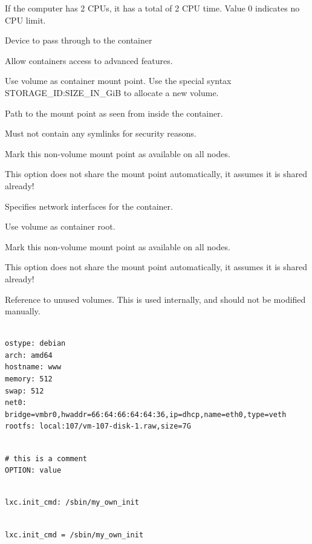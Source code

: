 If the computer has 2 CPUs, it has a total of 2 CPU time. Value 0 indicates no CPU limit.

Device to pass through to the container

Allow containers access to advanced features.

Use volume as container mount point. Use the special syntax STORAGE_ID:SIZE_IN_GiB to allocate a new volume.

Path to the mount point as seen from inside the container.

Must not contain any symlinks for security reasons.

Mark this non-volume mount point as available on all nodes.

This option does not share the mount point automatically, it assumes it is shared already!

Specifies network interfaces for the container.

Use volume as container root.

Mark this non-volume mount point as available on all nodes.

This option does not share the mount point automatically, it assumes it is shared already!

Reference to unused volumes. This is used internally, and should not be modified manually.

\begin{lstlisting}

ostype: debian
arch: amd64
hostname: www
memory: 512
swap: 512
net0: bridge=vmbr0,hwaddr=66:64:66:64:64:36,ip=dhcp,name=eth0,type=veth
rootfs: local:107/vm-107-disk-1.raw,size=7G

\end{lstlisting}

\begin{lstlisting}

# this is a comment
OPTION: value

\end{lstlisting}

\begin{lstlisting}

lxc.init_cmd: /sbin/my_own_init

\end{lstlisting}

\begin{lstlisting}

lxc.init_cmd = /sbin/my_own_init

\end{lstlisting}

